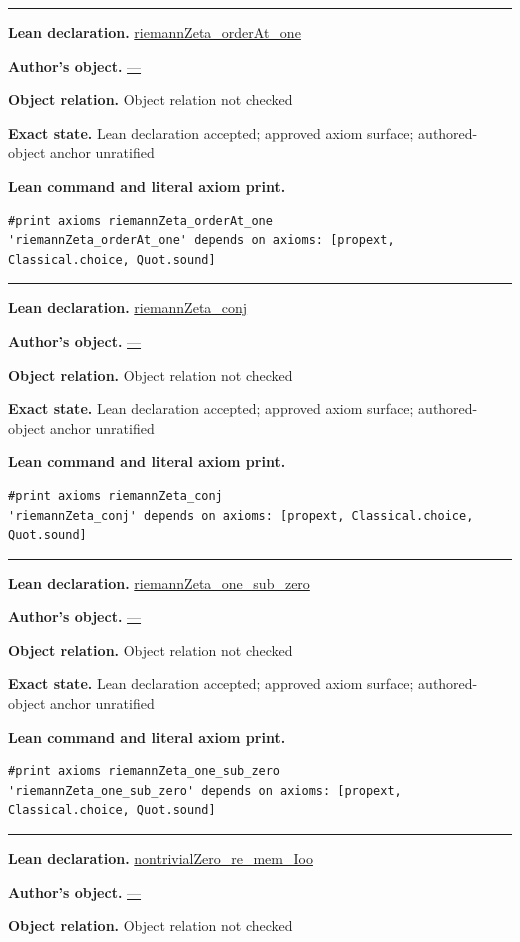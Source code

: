\documentclass[11pt]{article}
\theoremstyle{plain}
\theoremstyle{definition}
\theoremstyle{remark}
\begin{document}
\begin{tcolorbox}
\begin{Verbatim}[breaklines=true,breakanywhere=true,fontsize=\small]
\end{Verbatim}
\medskip\hrule\medskip
\textbf{Lean declaration.} \url{riemannZeta_orderAt_one}
\par\textbf{Author's object.} \url{—}
\par\textbf{Object relation.} Object relation not checked
\par\textbf{Exact state.} Lean declaration accepted; approved axiom surface; authored-object anchor unratified
\par\smallskip\textbf{Lean command and literal axiom print.}
\begin{Verbatim}[breaklines=true,breakanywhere=true,fontsize=\small]
#print axioms riemannZeta_orderAt_one
'riemannZeta_orderAt_one' depends on axioms: [propext, Classical.choice, Quot.sound]
\end{Verbatim}
\medskip\hrule\medskip
\textbf{Lean declaration.} \url{riemannZeta_conj}
\par\textbf{Author's object.} \url{—}
\par\textbf{Object relation.} Object relation not checked
\par\textbf{Exact state.} Lean declaration accepted; approved axiom surface; authored-object anchor unratified
\par\smallskip\textbf{Lean command and literal axiom print.}
\begin{Verbatim}[breaklines=true,breakanywhere=true,fontsize=\small]
#print axioms riemannZeta_conj
'riemannZeta_conj' depends on axioms: [propext, Classical.choice, Quot.sound]
\end{Verbatim}
\medskip\hrule\medskip
\textbf{Lean declaration.} \url{riemannZeta_one_sub_zero}
\par\textbf{Author's object.} \url{—}
\par\textbf{Object relation.} Object relation not checked
\par\textbf{Exact state.} Lean declaration accepted; approved axiom surface; authored-object anchor unratified
\par\smallskip\textbf{Lean command and literal axiom print.}
\begin{Verbatim}[breaklines=true,breakanywhere=true,fontsize=\small]
#print axioms riemannZeta_one_sub_zero
'riemannZeta_one_sub_zero' depends on axioms: [propext, Classical.choice, Quot.sound]
\end{Verbatim}
\medskip\hrule\medskip
\textbf{Lean declaration.} \url{nontrivialZero_re_mem_Ioo}
\par\textbf{Author's object.} \url{—}
\par\textbf{Object relation.} Object relation not checked

\end{tcolorbox}
\end{document}
